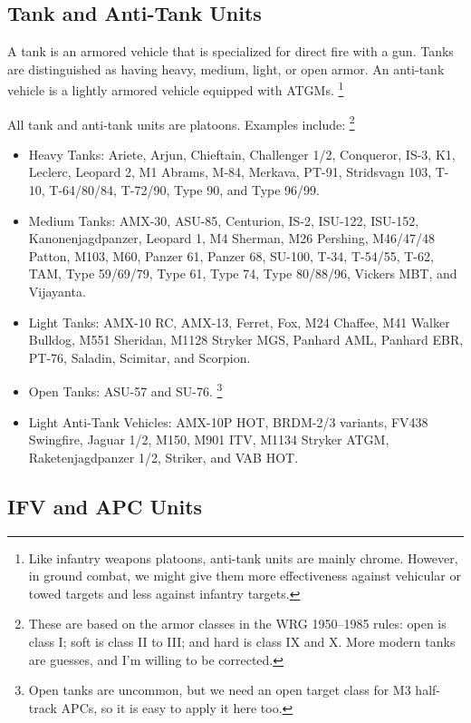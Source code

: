\documentclass[10pt]{article}
\newcommand{\note}[1]{%
    \footnote{%
        \setlength{\parindent}{0pt}%
        \setlength{\parskip}{\smallskipamount}%
        #1
    }%
}
\begin{document}
\subsection{Tank and Anti-Tank Units}

A tank is an armored vehicle that is specialized for direct fire with a gun.
Tanks are distinguished as having heavy, medium, light, or open armor.
An anti-tank vehicle is a lightly armored vehicle equipped with ATGMs.%
\note{
    Like infantry weapons platoons, anti-tank units are mainly chrome.
    However, in ground combat, we might give them more effectiveness against vehicular or towed targets and less against infantry targets.
}
All tank and anti-tank units are platoons.
Examples include:%
\note{
    These are based on the armor classes in the WRG 1950--1985 rules: open is class I; soft is class II to III; and hard is class IX and X.
    More modern tanks are guesses, and I'm willing to be corrected.
}

\begin{itemize}\raggedright
    \item Heavy Tanks: Ariete, Arjun, Chieftain, Challenger 1/2, Conqueror, IS-3, K1, Leclerc, Leopard 2, M1 Abrams, M-84, Merkava, PT-91, Stridsvagn 103, T-10, T-64/80/84, T-72/90, Type 90, and Type 96/99.
    \item Medium Tanks: AMX-30, ASU-85, Centurion,  IS-2, ISU-122, ISU-152, Kanonenjagdpanzer, Leopard 1, M4 Sherman, M26 Pershing, M46/47/48 Patton, M103, M60, Panzer 61, Panzer 68, SU-100, T-34, T-54/55, T-62, TAM, Type 59/69/79, Type 61, Type 74, Type 80/88/96, Vickers MBT, and Vijayanta.
    \item Light Tanks: AMX-10 RC, AMX-13, Ferret, Fox, M24 Chaffee, M41 Walker Bulldog, M551 Sheridan, M1128 Stryker MGS, Panhard AML, Panhard EBR, PT-76, Saladin, Scimitar, and Scorpion.
    \item Open Tanks: ASU-57 and SU-76.%
        \note{
            Open tanks are uncommon, but we need an open target class for M3 half-track APCs, so it is easy to apply it here too.
        }
    \item Light Anti-Tank Vehicles: AMX-10P HOT, BRDM-2/3 variants, FV438 Swingfire, Jaguar 1/2, M150, M901 ITV, M1134 Stryker ATGM, Raketenjagdpanzer 1/2, Striker, and VAB HOT.
\end{itemize}

\subsection{IFV and APC Units}
\end{document}
